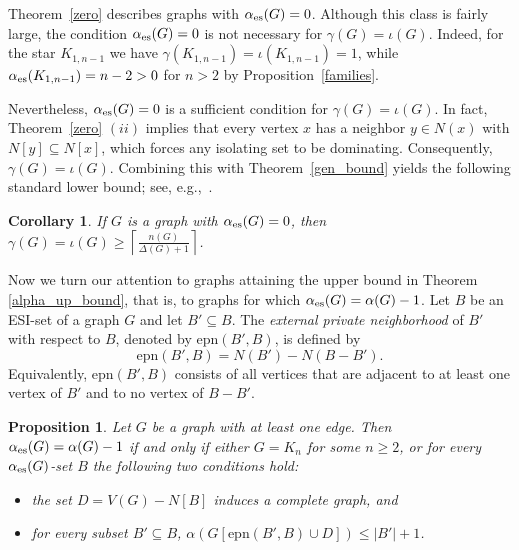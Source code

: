 \documentclass[11pt]{article}
\newtheorem{corollary}[theorem]{Corollary}
\newtheorem{proposition}[theorem]{Proposition}
\newcommand{\g}{\gamma}
\newcommand{\io}{\iota}
\newcommand{\es}{\alpha_{\rm es}}
\newcommand{\al}{\alpha}
\newcommand{\EPN}{\mathrm{epn}}
\begin{document}
Theorem~\ref{zero} describes graphs with $\es(G)=0$. Although this class is fairly large, the condition $\es(G)=0$ is not necessary for
$\gamma(G)=\io(G)$. Indeed, for the star $K_{1,n-1}$ we have $\gamma(K_{1,n-1})=\io(K_{1,n-1})=1$,
while $\es(K_{1,n-1})=n-2>0$ for $n>2$ by Proposition~\ref{families}.

Nevertheless, $\es(G)=0$ is a sufficient condition for $\gamma(G)=\io(G)$. In fact, Theorem~\ref{zero} $(ii)$ implies that every vertex $x$ has a neighbor $y\in N(x)$ with
$N[y]\subseteq N[x]$, which forces any isolating set to be dominating. Consequently, $\gamma(G)=\io(G)$. Combining this with Theorem~\ref{gen_bound} yields the following standard lower bound; see, e.g.,~\cite{core}.

\begin{corollary}
\label{gam=io}
If $G$ is a graph with $\es(G)=0$, then $\g(G)=\io(G)\geq \left\lceil\frac{n(G)}{\Delta(G)+1}\right\rceil$. 
\end{corollary}

Now we turn our attention to graphs attaining the upper bound in Theorem \ref{alpha_up_bound}, that is, to graphs for which $\es(G)=\al(G)-1$. Let $B$ be an ESI-set of a graph $G$ and let $B'\subseteq B$. The \emph{external private
neighborhood} of $B'$ with respect to $B$, denoted by $\EPN(B',B)$, is defined by
$$\EPN(B',B)=N(B')- N(B-B').$$
Equivalently, $\EPN(B',B)$ consists of all vertices that are adjacent to at least one vertex of $B'$ and to no vertex of $B-B'$.
\medskip

\begin{proposition}
\label{LB-clique}
Let $G$ be a graph  with at least one edge.  Then $\es(G)=\al(G)-1$ if and only if either $G=K_n$ for some $n\geq 2$, or for every $\es(G)$-set $B$ the following two conditions hold:
\begin{itemize}
\item[(i)] the set $D=V(G)-N[B]$ induces a complete graph, and
\item[(ii)] for every subset $B'\subseteq B$, $\alpha(G[\EPN(B',B)\cup D]) \leq |B'|+1$.
\end{itemize}
\end{proposition}
\end{document}
